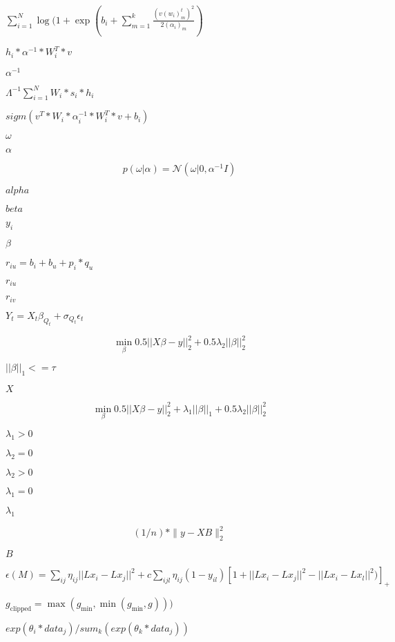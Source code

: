 \documentclass{article}
\begin{document}
$ \sum_{i=1}^N \log(1+\exp( b_i + \sum_{m=1}^k \frac{(v(w_i)_m^t)^2}{2(\alpha_i)_m}) $
\pagebreak

$ h_i*\alpha^{-1}*W_i^T*v $
\pagebreak

$ \alpha^{-1} $
\pagebreak

$ \Lambda^{-1} \sum_{i=1}^N W_i * s_i * h_i $
\pagebreak

$ sigm(v^T*W_i*\alpha_i^{-1}*W_i^T*v + b_i) $
\pagebreak

$ \omega $
\pagebreak

$ \alpha $
\pagebreak

\[ p(\omega|\alpha) = \mathcal{N}(\omega|0, \alpha^{-1}I) \]
\pagebreak

$ alpha $
\pagebreak

$ beta $
\pagebreak

$y_{i}$
\pagebreak

$ \beta $
\pagebreak

$ r_{iu} = b_i + b_u + p_i * q_u $
\pagebreak

$ r_{iu} $
\pagebreak

$ r_{iv} $
\pagebreak

$ Y_t = X_t \beta_{Q_t} + \sigma_{Q_t} \epsilon_t $
\pagebreak

\[ \min_{\beta} 0.5 || X \beta - y ||_2^2 + 0.5 \lambda_2 || \beta ||_2^2 \]
\pagebreak

$ ||\beta||_1 <= \tau $
\pagebreak

$ X $
\pagebreak

\[ \min_{\beta} 0.5 || X \beta - y ||_2^2 + \lambda_1 || \beta ||_1 + 0.5 \lambda_2 || \beta ||_2^2 \]
\pagebreak

$ \lambda_1 > 0 $
\pagebreak

$ \lambda_2 = 0 $
\pagebreak

$ \lambda_2 > 0 $
\pagebreak

$ \lambda_1 = 0 $
\pagebreak

$ \lambda_1 $
\pagebreak

\[ (1 / n) * \| y - X B \|^2_2 \]
\pagebreak

$ B $
\pagebreak

$ \epsilon(M) = \sum_{ij}\eta_{ij}|| L x_i - L x_j ||^2 + c\sum_{ijl}\eta_{ij}(1-y_{il})[1 + || L x_i - L x_j ||^2 - || L x_i - L x_l ||^2)]_{+} $
\pagebreak

$ g_{\text{clipped}} = \max(g_{\text{min}}, \min(g_{\text{min}}, g))) $
\pagebreak

$ exp(\theta_i * data_j) / sum_k(exp(\theta_k * data_j)) $
\pagebreak
\end{document}
